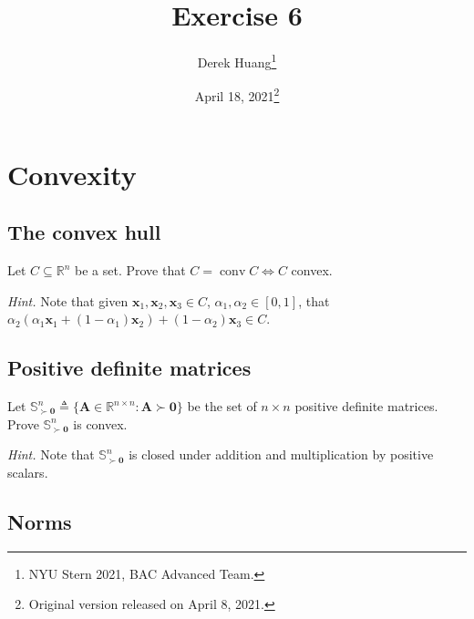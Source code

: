 \documentclass{article}
\title{Exercise 6}
\author{Derek Huang\thanks{NYU Stern 2021, BAC Advanced Team.}}
\date{April 18, 2021\thanks{Original version released on April 8, 2021.}}
\numberwithin{equation}{section}
\begin{document}
\maketitle
\thispagestyle{fancy}


\section{Convexity}

\subsection{The convex hull}

Let $ C \subseteq \mathbb{R}^n $ be a set. Prove that $ C =
\operatorname{conv} C \Leftrightarrow C $ convex.

\medskip

\textit{Hint.} Note that given $ \mathbf{x}_1, \mathbf{x}_2, \mathbf{x}_3
\in C $, $ \alpha_1, \alpha_2 \in [0, 1] $, that
$ \alpha_2(\alpha_1\mathbf{x}_1 + (1 - \alpha_1)\mathbf{x}_2) +
(1 - \alpha_2)\mathbf{x}_3 \in C $.

\subsection{Positive definite matrices}

Let $ \mathbb{S}_{\succ\mathbf{0}}^n \triangleq \{\mathbf{A} \in
\mathbb{R}^{n \times n} : \mathbf{A} \succ \mathbf{0}\} $ be the set of
$ n \times n $ positive definite matrices. Prove
$ \mathbb{S}_{\succ\mathbf{0}}^n $ is convex.

\medskip

\textit{Hint.} Note that $ \mathbb{S}_{\succ\mathbf{0}}^n $ is closed under
addition and multiplication by positive scalars.

\subsection{Norms}
\end{document}
